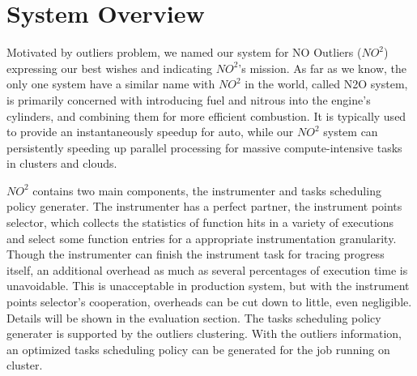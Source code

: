 \section{System Overview}

Motivated by outliers problem, we named our system for NO Outliers ($NO^2$) expressing our
best wishes and indicating $NO^2$'s mission. As far as we know, the only one system have a
similar name with $NO^2$ in the world, called N2O system, is primarily concerned with
introducing fuel and nitrous into the engine's cylinders, and combining them for more
efficient combustion. It is typically used to provide an instantaneously speedup for auto,
while our $NO^2$ system can persistently speeding up parallel processing for massive
compute-intensive tasks in clusters and clouds.

$NO^2$ contains two main components, the instrumenter and tasks scheduling policy
generater. The instrumenter has a perfect partner, the instrument points selector, which
collects the statistics of function hits in a variety of executions and select some
function entries for a appropriate instrumentation granularity. Though the instrumenter
can finish the instrument task for tracing progress itself, an additional overhead as much
as several percentages of execution time is unavoidable. This is unacceptable in
production system, but with the instrument points selector's cooperation, overheads can be
cut down to little, even negligible. Details will be shown in the evaluation section. The
tasks scheduling policy generater is supported by the outliers clustering. With the
outliers information, an optimized tasks scheduling policy can be generated for the job
running on cluster.

